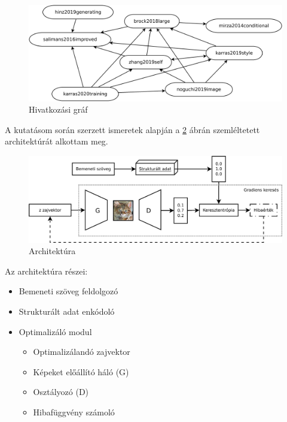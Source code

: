 
\begin{figure}[h]
	\centering
	\includegraphics[width=15cm]{images/gancite.png}
	\caption{Hivatkozási gráf}
	\label{fig:gancite}
\end{figure}



A kutatásom során szerzett ismeretek alapján a \ref{fig:architecture} ábrán szemléltetett architektúrát alkottam meg.

\begin{figure}[h]
\centering
\includegraphics[width=15cm]{images/architecture.png}
\caption{Architektúra}
\label{fig:architecture}
\end{figure}

Az architektúra részei:

\begin{itemize}
	\item Bemeneti szöveg feldolgozó
	\item Strukturált adat enkódoló
	\item Optimalizáló modul
		\begin{itemize}
			\item Optimalizálandó zajvektor
			\item Képeket előállító háló (G)
			\item Osztályozó (D)
			\item Hibafüggvény számoló
		\end{itemize}
\end{itemize}


